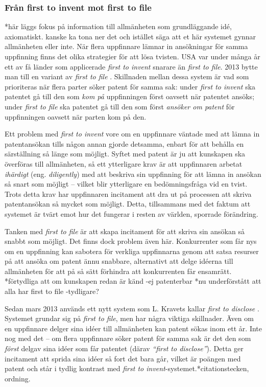 \subsubsection{Från first to invent mot first to file} *här läggs fokus på information till allmänheten som grundläggande idé, axiomatiskt. kanske ka tona ner det och istället säga att et här systemet gynnar allmänheten eller inte.
När flera uppfinnare lämnar in ansökningar för samma uppfinning finns det olika strategier för att lösa tvisten. USA var under många år ett av få länder som applicerade \emph{first to invent} snarare än \emph{first to file}. 2013 bytte man till en variant av \emph{first to file} \cite{kravets}. Skillnaden mellan dessa system är vad som prioriteras när flera parter söker patent för samma sak: under \emph{first to invent} ska patentet gå till den som \emph{kom på} uppfinningen först oavsett när patentet ansöks; under \emph{first to file} ska patentet gå till den som först \emph{ansöker om patent} för uppfinningen oavsett när parten kom på den.

Ett problem med \emph{first to invent} vore om en uppfinnare väntade med att lämna in patentansökan tills någon annan gjorde detsamma, enbart för att behålla en särställning så länge som möjligt. Syftet med patent är ju att kunskapen ska överföras till allmänheten, så ett ytterligare krav är att uppfinnaren arbetat \emph{ihärdigt} (eng. \emph{diligently}) med att beskriva sin uppfinning för att lämna in ansökan så snart som möjligt -- vilket blir ytterligare en bedömningsfråga vid en tvist. Trots detta krav har uppfinnaren incitament att dra ut på processen att skriva patentansökan så mycket som möjligt. Detta, tillsammans med det faktum att systemet är tvärt emot hur det fungerar i resten av världen, sporrade förändring.

Tanken med \emph{first to file} är att skapa incitament för att skriva sin ansökan så snabbt som möjligt. Det finns dock problem även här. Konkurrenter som får nys om en uppfinning kan sabotera för verkliga uppfinnarna genom att satsa resurser på att ansöka om patent ännu snabbare, alternativt att delge idéerna till allmänheten för att på så sätt förhindra att konkurrenten får ensamrätt. *förtydliga att om kunskapen redan är känd -ej patenterbar *nu underförstått att alla har first to file -tydligare?

Sedan mars 2013 används ett nytt system som L. Kravets kallar \emph{first to disclose} \cite{kravets}. Systemet grundar sig på \emph{first to file}, men har några viktiga skillnader. Även om en uppfinnare delger sina idéer till allmänheten kan patent sökas inom ett år. Inte nog med det -- om flera uppfinnare söker patent för samma sak är det den som \emph{först} delgav sina idéer som får patentet (därav \emph{``first to disclose''}). Detta ger incitament att sprida sina idéer så fort det bara går, vilket är poängen med patent och står i tydlig kontrast med \emph{first to invent}-systemet.*citationstecken, ordning.


